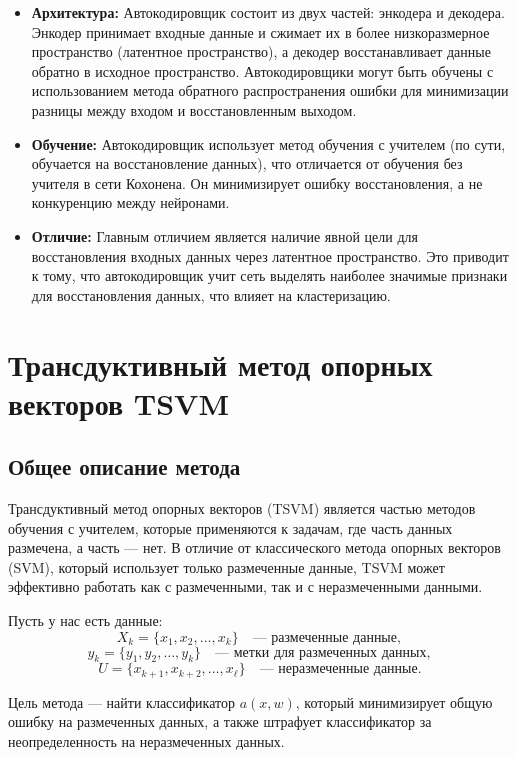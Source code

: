 \begin{itemize}
\begin{itemize}
    \item \textbf{Архитектура:} Автокодировщик состоит из двух частей: энкодера и декодера. Энкодер принимает входные данные и сжимает их в более низкоразмерное пространство (латентное пространство), а декодер восстанавливает данные обратно в исходное пространство. Автокодировщики могут быть обучены с использованием метода обратного распространения ошибки для минимизации разницы между входом и восстановленным выходом.
    \item \textbf{Обучение:} Автокодировщик использует метод обучения с учителем (по сути, обучается на восстановление данных), что отличается от обучения без учителя в сети Кохонена. Он минимизирует ошибку восстановления, а не конкуренцию между нейронами.
    \item \textbf{Отличие:} Главным отличием является наличие явной цели для восстановления входных данных через латентное пространство. Это приводит к тому, что автокодировщик учит сеть выделять наиболее значимые признаки для восстановления данных, что влияет на кластеризацию.
\end{itemize}

\section*{Трансдуктивный метод опорных векторов TSVM}

\subsection{Общее описание метода}

Трансдуктивный метод опорных векторов (TSVM) является частью методов обучения с учителем, которые применяются к задачам, где часть данных размечена, а часть — нет. В отличие от классического метода опорных векторов (SVM), который использует только размеченные данные, TSVM может эффективно работать как с размеченными, так и с неразмеченными данными.

Пусть у нас есть данные:
\[
    X_k = \{x_1, x_2, \dots, x_k\} \quad \text{— размеченные данные},
\]
\[
    y_k = \{y_1, y_2, \dots, y_k\} \quad \text{— метки для размеченных данных},
\]
\[
    U = \{x_{k+1}, x_{k+2}, \dots, x_\ell\} \quad \text{— неразмеченные данные}.
\]

Цель метода — найти классификатор \( a(x, w) \), который минимизирует общую ошибку на размеченных данных, а также штрафует классификатор за неопределенность на неразмеченных данных.


\end{itemize}
